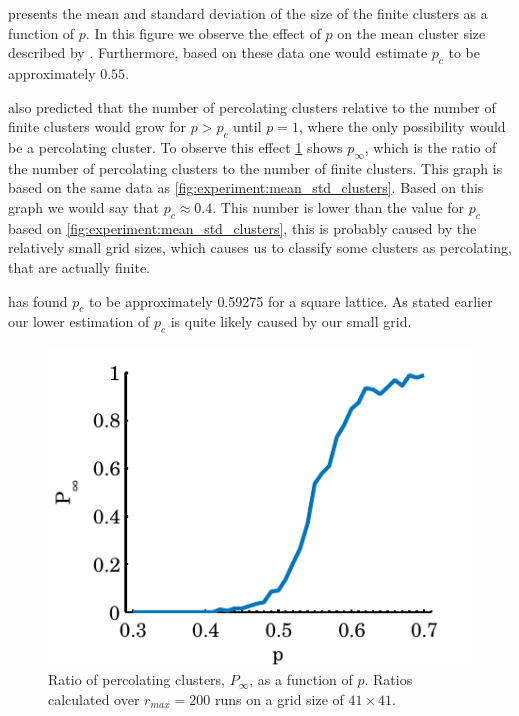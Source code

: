  presents the mean and standard deviation of the size of the finite clusters as a function of $p$. In this figure we observe the effect of $p$ on the mean cluster size described by \citeauthor{kenzel1997physics}. Furthermore, based on these data one would estimate $p_c$ to be approximately $0.55$. 

\citeauthor{kenzel1997physics} also predicted that the number of percolating clusters relative to the number of finite clusters would grow for $p > p_c$ until $p = 1$, where the only possibility would be a percolating cluster. To observe this effect \cref{fig:experiment:p_inf_ratio} shows $p_\infty$, which is the ratio of the number of percolating clusters to the number of finite clusters. This graph is based on the same data as \cref{fig:experiment:mean_std_clusters}. Based on this graph we would say that $p_c \approx \num{0.4}$. This number is lower than the value for $p_c$ based on \cref{fig:experiment:mean_std_clusters}, this is probably caused by the relatively small grid sizes, which causes us to classify some clusters as percolating, that are actually finite. 

\textcite{stauffer1994introduction} has found $p_c$ to be approximately \num{0.59275} for a square lattice. As stated earlier our lower estimation of $p_c$ is quite likely caused by our small grid. 

\begin{figure}
	\centering
	\includegraphics[width=\columnwidth]{./img/assignment_a_p_infinite_ratio_p.pdf}
	\caption{Ratio of percolating clusters, $P_\infty$, as a function of $p$. Ratios calculated over $r_{max} = 200$ runs on a grid size of $41 \times 41$.}
	\label{fig:experiment:p_inf_ratio}
\end{figure}